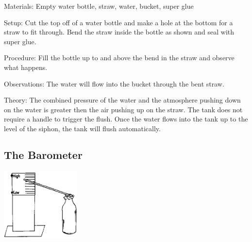 \begin{multicols}{2}
\begin{description*}
\item[Materials:]{Empty water bottle, straw, water, bucket, super glue}
\item[Setup:]{Cut the top off of a water bottle and make a hole at the bottom for a straw to fit through. Bend the straw inside the bottle as shown and seal with super glue.}
\item[Procedure:]{Fill the bottle up to and above the bend in the straw and observe what happens.}
\item[Observations:]{The water will flow into the bucket through the bent straw.}
\item[Theory:]{The combined pressure of the water and the atmosphere pushing down on the water is greater then the air pushing up on the straw. The tank does not require a handle to trigger the flush. Once the water flows into the tank up to the level of the siphon, the tank will flush automatically. }
\end{description*}

\columnbreak

\subsection{The Barometer}

\begin{center}
\includegraphics[width=0.3\textwidth]{./img/source/barometer.png}
\end{center}


\end{multicols}
